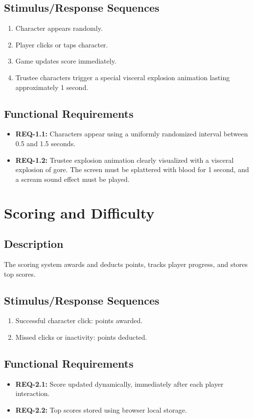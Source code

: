 \documentclass{scrreprt}
\begin{document}
\subsection{Stimulus/Response Sequences}
\begin{enumerate}
    \item Character appears randomly.
    \item Player clicks or taps character.
    \item Game updates score immediately.
    \item Trustee characters trigger a special visceral explosion animation lasting approximately 1 second.
\end{enumerate}

\subsection{Functional Requirements}
\begin{itemize}
    \item \textbf{REQ-1.1:} Characters appear using a uniformly randomized interval between 0.5 and 1.5 seconds.
    \item \textbf{REQ-1.2:} Trustee explosion animation clearly visualized with a visceral explosion of gore. The screen must be splattered with blood for 1 second, and a scream sound effect must be played.
\end{itemize}

\section{Scoring and Difficulty}

\subsection{Description}
The scoring system awards and deducts points, tracks player progress, and stores top scores.

\subsection{Stimulus/Response Sequences}
\begin{enumerate}
    \item Successful character click: points awarded.
    \item Missed clicks or inactivity: points deducted.
\end{enumerate}

\subsection{Functional Requirements}
\begin{itemize}
    \item \textbf{REQ-2.1:} Score updated dynamically, immediately after each player interaction.
    \item \textbf{REQ-2.2:} Top scores stored using browser local storage.
\end{itemize}
\end{document}
